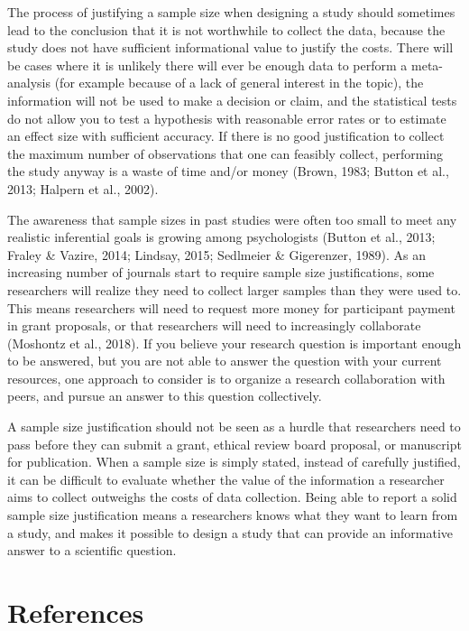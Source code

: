 \documentclass[
  english,
  ,jou, a4paper,floatsintext]{apa6}
\begin{document}
The process of justifying a sample size when designing a study should sometimes lead to the conclusion that it is not worthwhile to collect the data, because the study does not have sufficient informational value to justify the costs. There will be cases where it is unlikely there will ever be enough data to perform a meta-analysis (for example because of a lack of general interest in the topic), the information will not be used to make a decision or claim, and the statistical tests do not allow you to test a hypothesis with reasonable error rates or to estimate an effect size with sufficient accuracy. If there is no good justification to collect the maximum number of observations that one can feasibly collect, performing the study anyway is a waste of time and/or money (Brown, 1983; Button et al., 2013; Halpern et al., 2002).

The awareness that sample sizes in past studies were often too small to meet any realistic inferential goals is growing among psychologists (Button et al., 2013; Fraley \& Vazire, 2014; Lindsay, 2015; Sedlmeier \& Gigerenzer, 1989). As an increasing number of journals start to require sample size justifications, some researchers will realize they need to collect larger samples than they were used to. This means researchers will need to request more money for participant payment in grant proposals, or that researchers will need to increasingly collaborate (Moshontz et al., 2018). If you believe your research question is important enough to be answered, but you are not able to answer the question with your current resources, one approach to consider is to organize a research collaboration with peers, and pursue an answer to this question collectively.

A sample size justification should not be seen as a hurdle that researchers need to pass before they can submit a grant, ethical review board proposal, or manuscript for publication. When a sample size is simply stated, instead of carefully justified, it can be difficult to evaluate whether the value of the information a researcher aims to collect outweighs the costs of data collection. Being able to report a solid sample size justification means a researchers knows what they want to learn from a study, and makes it possible to design a study that can provide an informative answer to a scientific question.

\hypertarget{references}{%
\section{References}\label{references}}
\end{document}
